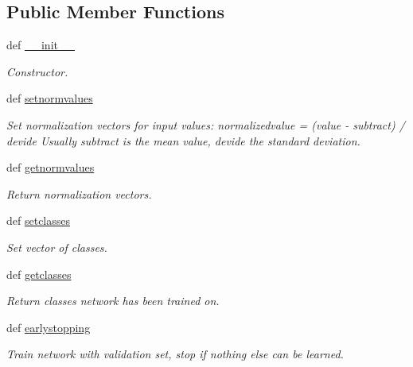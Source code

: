 \subsection*{Public Member Functions}
\begin{DoxyCompactItemize}
\item 
def \hyperlink{classmlp_1_1mlp_a2bef8117288f389f454a7a96d044db73}{\_\-\_\-init\_\-\_\-}
\begin{DoxyCompactList}\small\item\em Constructor. \item\end{DoxyCompactList}\item 
def \hyperlink{classmlp_1_1mlp_a9e27c383a6bb840545bad2b0b6c18cfd}{setnormvalues}
\begin{DoxyCompactList}\small\item\em Set normalization vectors for input values: normalizedvalue = (value -\/ subtract) / devide Usually subtract is the mean value, devide the standard deviation. \item\end{DoxyCompactList}\item 
def \hyperlink{classmlp_1_1mlp_a3fadca9214b0ef2eb801f820cbe34196}{getnormvalues}
\begin{DoxyCompactList}\small\item\em Return normalization vectors. \item\end{DoxyCompactList}\item 
def \hyperlink{classmlp_1_1mlp_a8411b7d198a35a86ef134f6f7ed7045f}{setclasses}
\begin{DoxyCompactList}\small\item\em Set vector of classes. \item\end{DoxyCompactList}\item 
def \hyperlink{classmlp_1_1mlp_af3f30cb683a757eb4e9286ec48817dc4}{getclasses}
\begin{DoxyCompactList}\small\item\em Return classes network has been trained on. \item\end{DoxyCompactList}\item 
def \hyperlink{classmlp_1_1mlp_a5a681e9f1fe0aa039aa75dfb99f69f8c}{earlystopping}
\begin{DoxyCompactList}\small\item\em Train network with validation set, stop if nothing else can be learned. \item\end{DoxyCompactList}\item 

\end{DoxyCompactItemize}
